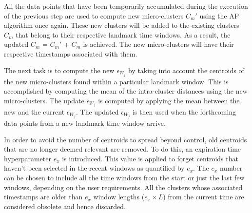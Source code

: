     
    
    
    
    All the data points that have been temporarily accumulated during the execution of the previous step are used to compute new micro-clusters $C_m'$ using the AP algorithm once again. These new clusters will be added to the existing clusters $C_m$ that belong to their respective landmark time windows. As a result, the updated $C_m$ = $C_m'$ + $C_m$ is achieved. The new micro-clusters will have their respective timestamps associated with them.
    

    The next task is to compute the new $\epsilon_{W_j}$ by taking into account the centroids of the new micro-clusters found within a particular landmark window. This is accomplished by computing the mean of the intra-cluster distances using the new micro-clusters. The update $\epsilon_{W_j}$ is computed by applying the mean between the new and the current $\epsilon_{W_j}$. The updated $\epsilon_{W_j}$ is then used when the forthcoming data points from a new landmark time window arrive.
    
    
  
    
    

   In order to avoid the number of centroids to spread beyond control, old centroids that are no longer deemed relevant are removed. To do this, an expiration time hyperparameter $e_x$ is introduced. This value is applied to forget centroids that haven't been selected in the recent windows as quantified by $e_x$. The $e_x$ number can be chosen to include all the time windows from the start or just the last few windows, depending on the user requirements. All the clusters whose associated timestamps are older than $e_x$ window lengths ($e_x \times L$) from the current time are considered obsolete and hence discarded. 
   
